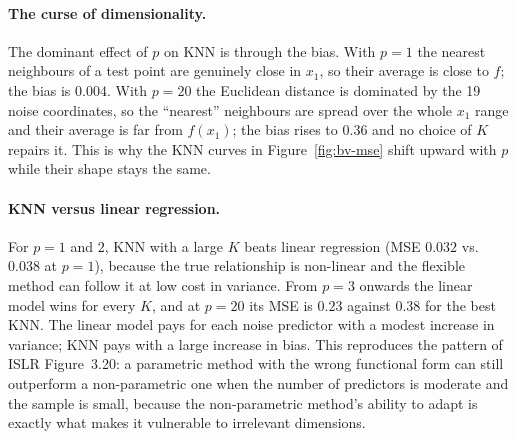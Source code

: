 \paragraph{The curse of dimensionality.}
The dominant effect of $p$ on KNN is through the bias. With $p = 1$ the nearest neighbours of a test point are genuinely close in $x_1$, so their average is close to $f$; the bias is $0.004$. With $p = 20$ the Euclidean distance is dominated by the 19 noise coordinates, so the ``nearest'' neighbours are spread over the whole $x_1$ range and their average is far from $f(x_1)$; the bias rises to $0.36$ and no choice of $K$ repairs it. This is why the KNN curves in Figure~\ref{fig:bv-mse} shift upward with $p$ while their shape stays the same.

\paragraph{KNN versus linear regression.}
For $p = 1$ and $2$, KNN with a large $K$ beats linear regression (MSE $0.032$ vs.\ $0.038$ at $p = 1$), because the true relationship is non-linear and the flexible method can follow it at low cost in variance. From $p = 3$ onwards the linear model wins for every $K$, and at $p = 20$ its MSE is $0.23$ against $0.38$ for the best KNN. The linear model pays for each noise predictor with a modest increase in variance; KNN pays with a large increase in bias. This reproduces the pattern of ISLR Figure~3.20: a parametric method with the wrong functional form can still outperform a non-parametric one when the number of predictors is moderate and the sample is small, because the non-parametric method's ability to adapt is exactly what makes it vulnerable to irrelevant dimensions.
